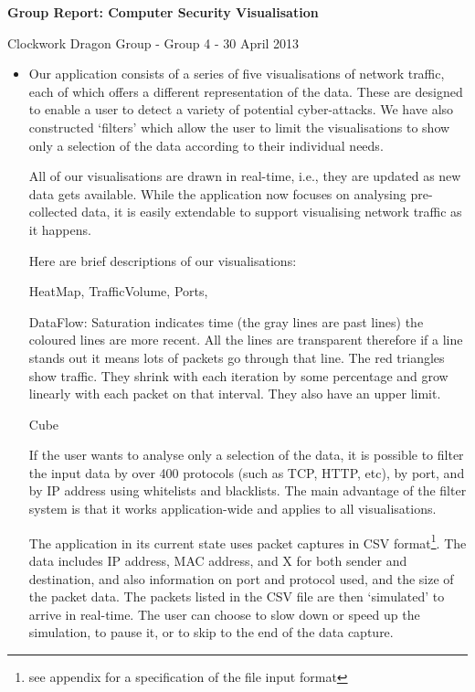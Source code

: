 \documentclass[12pt,a4paper]{article}
\begin{document}
	
	\begin{center}
		\textbf{Group Report: Computer Security Visualisation}
		
		Clockwork Dragon Group - Group 4 - 30 April 2013
	\end{center}
	\bigskip \bigskip
	\begin{itemize}
		\item Our application consists of a series of five visualisations of network traffic, each of which offers a different representation of the data. These are designed to enable a user to detect a variety of potential cyber-attacks. 
			We have also constructed `filters' which allow the user to limit the visualisations to show only a selection of the data according to their individual needs. 
			
			All of our visualisations are drawn in real-time, i.e., they are updated as new data gets available. While the application now focuses on analysing pre-collected data, it is easily extendable to support visualising network traffic as it happens.
			
			Here are brief descriptions of our visualisations:
			
			HeatMap, TrafficVolume, Ports, 
			
			DataFlow: Saturation indicates time (the gray lines are past lines) the coloured lines are more recent. All the lines are transparent therefore if a line stands out it means lots of packets go through that line. The red triangles show traffic. They shrink with each iteration by some percentage and grow linearly with each packet on that interval. They also have an upper limit.

Cube
			
			If the user wants to analyse only a selection of the data, it is possible to filter the input data by over 400 protocols (such as TCP, HTTP, etc), by port, and by IP address using whitelists and blacklists. The main advantage of the filter system is that it works application-wide and applies to all visualisations.
			
			The application in its current state uses packet captures in CSV format\footnote{see appendix for a specification of the file input format}. The data includes IP address, MAC address, and X for both sender and destination, and also information on port and protocol used, and the size of the packet data. The packets listed in the CSV file are then `simulated' to arrive in real-time. The user can choose to slow down or speed up the simulation, to pause it, or to skip to the end of the data capture.
			

\end{itemize}
\end{document}
